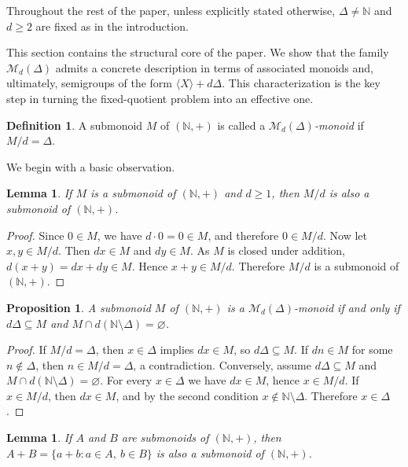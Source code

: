 \documentclass[12pt,a4paper]{amsart}
\newtheorem{lemma}[theorem]{Lemma}
\newtheorem{proposition}[theorem]{Proposition}
\theoremstyle{definition}
\newtheorem{definition}[theorem]{Definition}
\theoremstyle{remark}
\begin{document}
Throughout the rest of the paper, unless explicitly stated otherwise,  $\Delta\neq\mathbb N$ and $d\ge 2$ are fixed as in the introduction.

This section contains the structural core of the paper. We show that the family $\mathcal{M}_d(\Delta)$ admits a concrete description in terms of associated monoids and, ultimately, semigroups of the form $\langle X \rangle+d\Delta$. This characterization is the key step in turning the fixed-quotient problem into an effective one.

\begin{definition}\label{def:2.1}
A submonoid $M$ of $(\mathbb{N},+)$ is called a \emph{$\mathcal{M}_d(\Delta)$-monoid} if $M/d=\Delta$.
\end{definition}

We begin with a basic observation.

\begin{lemma}
If $M$ is a submonoid of $(\mathbb{N},+)$ and $d\ge 1$, then $M/d$ is also a submonoid of $(\mathbb{N},+)$.
\end{lemma}

\begin{proof}
Since $0\in M$, we have $d\cdot 0=0\in M$, and therefore $0\in M/d$. Now let $x,y\in M/d$. Then
$dx\in M$ and $dy\in M$. As $M$ is closed under addition, $d(x+y)=dx+dy\in M$.
Hence $x+y\in M/d$. Therefore $M/d$ is a submonoid of $(\mathbb{N},+)$.
\end{proof}

\begin{proposition}
A submonoid $M$ of $(\mathbb{N},+)$ is a $\mathcal{M}_d(\Delta)$-monoid if and only if $d\Delta\subseteq M$ and
$M\cap d(\mathbb{N}\setminus \Delta)=\varnothing$.
\end{proposition}

\begin{proof}
If $M/d=\Delta$, then $x\in \Delta$ implies $dx\in M$, so $d\Delta\subseteq M$. If $dn\in M$ for some
$n\notin \Delta$, then $n\in M/d=\Delta$, a contradiction. Conversely, assume $d\Delta\subseteq M$ and
$M\cap d(\mathbb{N}\setminus \Delta)=\varnothing$. For every $x\in \Delta$ we have $dx\in M$, hence $x\in M/d$.
If $x\in M/d$, then $dx\in M$, and by the second condition $x\notin \mathbb{N}\setminus \Delta$. Therefore $x\in \Delta$.
\end{proof}

\begin{lemma}
If $A$ and $B$ are submonoids of $(\mathbb{N},+)$, then $A+B=\{a+b : a\in A,\ b\in B\}$ is also a submonoid of $(\mathbb{N},+)$.
\end{lemma}
\end{document}

